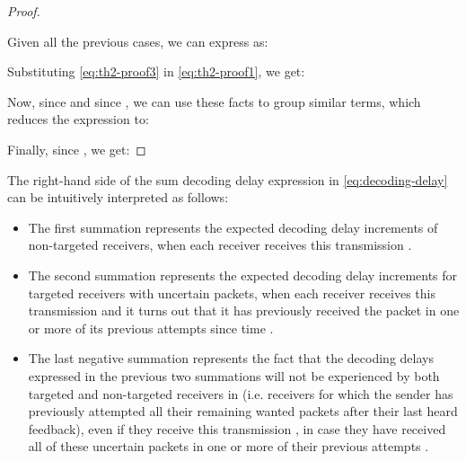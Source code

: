 \documentclass[10pt,jounral]{IEEEtran}
\newcommand{\ignore}[1]{}
\begin{document}
\begin{proof}
\begin{doublecol}
\begin{itemize}
\end{itemize}
\end{doublecol}
Given all the previous cases, we can\ignore{ summarize the probabilities of decoding delay increments equal to 1 as follows} express  as:

Substituting \eqref{eq:th2-proof3} in \eqref{eq:th2-proof1}, we get:
\begin{singlecol}

\end{singlecol}
\begin{doublecol}

\end{doublecol}
Now, since  and since , we can use these facts to group similar terms, which reduces the expression to:

Finally, since , we get:


\end{proof}

The right-hand side of the sum decoding delay expression in \eqref{eq:decoding-delay} can be intuitively interpreted as follows:
\begin{itemize}
\item The first summation represents the expected decoding delay increments of non-targeted receivers, when each receiver  receives this transmission .
\item The second summation represents the expected decoding delay increments for targeted receivers with uncertain packets, when each receiver  receives this transmission  and it turns out that it has previously received the packet  in one or more of its previous attempts since time  .
\item The last negative summation represents the fact that the decoding delays expressed in the previous two summations will not be experienced by both targeted and non-targeted receivers in  (i.e. receivers for which the sender has previously attempted all their remaining wanted packets after their last heard feedback), even if they receive this transmission , in case they have received all of these uncertain packets in one or more of their previous attempts .
\end{itemize}
\end{document}
